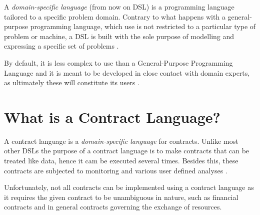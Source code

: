 \documentclass{ituthesis}
\begin{document}
A \textit{domain-specific language} (from now on DSL) is a programming language tailored to a specific problem domain. Contrary to what happens with a general-purpose programming language, which use is not restricted to a particular type of problem or machine, a DSL is built with the sole purpose of modelling and expressing a specific set of problems \cite{van2000domain}.

By default, it is less complex to use than a General-Purpose Programming Language and it is meant to be developed in close contact with domain experts, as ultimately these will constitute its users \cite{dsl}.

\section{What is a Contract Language?}
A contract language is a \textit{domain-specific language} for contracts. Unlike most other DSLs the purpose of a contract language is to make contracts that can be treated like data, hence it cam be executed several times. Besides this, these contracts are subjected to monitoring and various user defined analyses \cite{andersen2006compositional}.

Unfortunately, not all contracts can be implemented using a contract language as it requires the given contract to be unambiguous in nature, such as financial contracts and in general contracts governing the exchange of resources.

\end{document}

